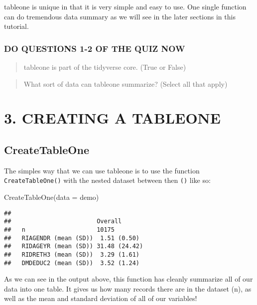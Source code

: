 \documentclass[
]{book}
\newenvironment{Shaded}{\begin{snugshade}}{\end{snugshade}}
\newcommand{\AttributeTok}[1]{\textcolor[rgb]{0.77,0.63,0.00}{#1}}
\newcommand{\FunctionTok}[1]{\textcolor[rgb]{0.00,0.00,0.00}{#1}}
\newcommand{\NormalTok}[1]{#1}
\begin{document}
tableone is unique in that it is very simple and easy to use. One single function can do tremendous data summary as we will see in the later sections in this tutorial.

\hypertarget{do-questions-1-2-of-the-quiz-now}{%
\subsubsection{DO QUESTIONS 1-2 OF THE QUIZ NOW}\label{do-questions-1-2-of-the-quiz-now}}

\begin{quote}
tableone is part of the tidyverse core. (True or False)
\end{quote}

\begin{quote}
What sort of data can tableone summarize? (Select all that apply)
\end{quote}

\hypertarget{creating-a-tableone}{%
\section{3. CREATING A TABLEONE}\label{creating-a-tableone}}

\hypertarget{createtableone}{%
\subsection{CreateTableOne}\label{createtableone}}

The simples way that we can use tableone is to use the function \texttt{CreateTableOne()} with the nested dataset between then \texttt{()} like so:

\begin{Shaded}
\begin{Highlighting}[]
\FunctionTok{CreateTableOne}\NormalTok{(}\AttributeTok{data =}\NormalTok{ demo)}
\end{Highlighting}
\end{Shaded}

\begin{verbatim}
##                       
##                        Overall      
##   n                    10175        
##   RIAGENDR (mean (SD))  1.51 (0.50) 
##   RIDAGEYR (mean (SD)) 31.48 (24.42)
##   RIDRETH3 (mean (SD))  3.29 (1.61) 
##   DMDEDUC2 (mean (SD))  3.52 (1.24)
\end{verbatim}

As we can see in the output above, this function has cleanly summarize all of our data into one table. It gives us how many records there are in the dataset (n), as well as the mean and standard deviation of all of our variables!
\end{document}
